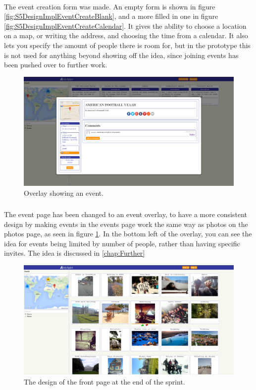 \paragraph{} The event creation form was made. An empty form is shown in figure \ref{fig:S5DesignImplEventCreateBlank}, and a more filled in one in figure \ref{fig:S5DesignImplEventCreateCalendar}. It gives the ability to choose a location on a map, or writing the address, and choosing the time from a calendar. It also lets you specify the amount of people there is room for, but in the prototype this is not used for anything beyond showing off the idea, since joining events has been pushed over to further work.

\begin{figure}[ht!]
  \centering
  \includegraphics[width=\linewidth]{./img/webpage/3Nov/EventsOverlay}
  \caption{Overlay showing an event.}
  \label{fig:S5DesignImplEventsOverlay}
\end{figure}

\subparagraph{} The event page has been changed to an event overlay, to have a more consistent design by making events in the events page work the same way as photos on the photos page, as seen in figure \ref{fig:S5DesignImplEventsOverlay}. In the bottom left of the overlay, you can see the idea for events being limited by number of people, rather than having specific invites. The idea is discussed in \ref{chap:Further}

\begin{figure}[ht!]
  \centering
  \includegraphics[width=\linewidth]{./img/webpage/3Nov/FrontpagePhotos}
  \caption{The design of the front page at the end of the sprint.}
  \label{fig:S5DesignImplFrontPhotos3Nov}
\end{figure}

